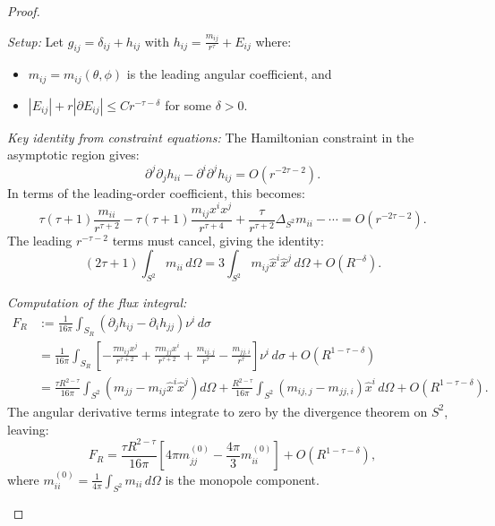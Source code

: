 \begin{proof}
\begin{remark}
\textit{Setup:} Let $g_{ij} = \delta_{ij} + h_{ij}$ with $h_{ij} = \frac{m_{ij}}{r^\tau} + E_{ij}$ where:
\begin{itemize}
    \item $m_{ij} = m_{ij}(\theta, \phi)$ is the leading angular coefficient, and
    \item $|E_{ij}| + r|\partial E_{ij}| \le C r^{-\tau - \delta}$ for some $\delta > 0$.
\end{itemize}

\textit{Key identity from constraint equations:} The Hamiltonian constraint in the asymptotic region gives:
\begin{equation}\label{eq:HamiltonianConstraintAsymptotic}
    \partial^j \partial_j h_{ii} - \partial^i \partial^j h_{ij} = O(r^{-2\tau - 2}).
\end{equation}
In terms of the leading-order coefficient, this becomes:
\begin{equation}
    \tau(\tau + 1) \frac{m_{ii}}{r^{\tau + 2}} - \tau(\tau + 1) \frac{m_{ij} x^i x^j}{r^{\tau + 4}} + \frac{\tau}{r^{\tau + 2}} \Delta_{S^2} m_{ii} - \cdots = O(r^{-2\tau - 2}).
\end{equation}
The leading $r^{-\tau-2}$ terms must cancel, giving the identity:
\begin{equation}\label{eq:MassAspectIdentity}
    (2\tau + 1) \int_{S^2} m_{ii} \, d\Omega = 3 \int_{S^2} m_{ij} \hat{x}^i \hat{x}^j \, d\Omega + O(R^{-\delta}).
\end{equation}

\textit{Computation of the flux integral:}
\begin{align}
    F_R &:= \frac{1}{16\pi} \int_{S_R} (\partial_j h_{ij} - \partial_i h_{jj}) \nu^i \, d\sigma \\
    &= \frac{1}{16\pi} \int_{S_R} \left[ -\frac{\tau m_{ij} x^j}{r^{\tau+2}} + \frac{\tau m_{jj} x^i}{r^{\tau+2}} + \frac{m_{ij,j}}{r^\tau} - \frac{m_{jj,i}}{r^\tau} \right] \nu^i \, d\sigma + O(R^{1-\tau-\delta}) \\
    &= \frac{\tau R^{2-\tau}}{16\pi} \int_{S^2} \left( m_{jj} - m_{ij} \hat{x}^i \hat{x}^j \right) d\Omega + \frac{R^{2-\tau}}{16\pi} \int_{S^2} (m_{ij,j} - m_{jj,i}) \hat{x}^i \, d\Omega + O(R^{1-\tau-\delta}).
\end{align}
The angular derivative terms integrate to zero by the divergence theorem on $S^2$, leaving:
\begin{equation}
    F_R = \frac{\tau R^{2-\tau}}{16\pi} \left[ 4\pi m_{jj}^{(0)} - \frac{4\pi}{3} m_{ii}^{(0)} \right] + O(R^{1-\tau-\delta}),
\end{equation}
where $m_{ii}^{(0)} = \frac{1}{4\pi}\int_{S^2} m_{ii} \, d\Omega$ is the monopole component.


\end{remark}
\end{proof}
